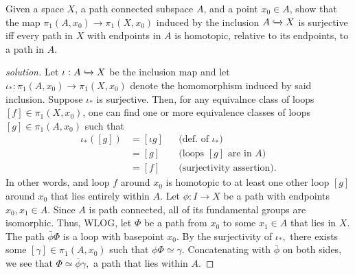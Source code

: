 \documentclass{article}
\newcommand{\1}{\mathbbm{1}}
\newenvironment{problem}[2][Problem]{\begin{trivlist}
\item[\hskip \labelsep {\bfseries #1}\hskip \labelsep {\bfseries #2.}]}{\end{trivlist}}
\begin{document}
\begin{problem}{6}
    Given a space $X$, a path connected subspace $A$, and a point $x_0 \in A$, show that the map $\pi_1(A, x_0) \longrightarrow \pi_1(X, x_0)$ induced by the inclusion $A \xhookrightarrow{} X$ is surjective iff every path in $X$ with endpoints in $A$ is homotopic, relative to its endpoints, to a path in $A.$
\end{problem}
\begin{proof}[solution]
    Let $\iota:A \xhookrightarrow{} X$ be the inclusion map and let $\iota_*:\pi_1(A, x_0) \longrightarrow \pi_1(X, x_0)$ denote the homomorphism induced by said inclusion. Suppose $\iota_*$ is surjective. Then, for any equivalnce class of loops $[f] \in \pi_1(X, x_0)$, one can find one or more equivalence classes of loops $[g] \in \pi_1(A, x_0)$ such that
    \begin{align*}
        \iota_*([g]) 
        &= [\iota g] && \text{(def. of $\iota_*$)} \\
        &= [g] && \text{(loops $[g]$ are in $A$)} \\
        &= [f] && \text{(surjectivity assertion)}.
    \end{align*} 
    In other words, and loop $f$ around $x_0$ is homotopic to at least one other loop $[g]$ around $x_0$ that lies entirely within $A.$ Let $\phi : I \longrightarrow X$ be a path with endpoints $x_0, x_1\in A.$ Since $A$ is path connected, all of its fundamental groups are isomorphic. Thus, WLOG, let $\Phi$ be a path from $x_0$ to some $x_1 \in A$ that lies in $X.$ The path $\bar{\phi}\Phi$ is a loop with basepoint $x_0.$ By the surjectivity of $\iota_*,$ there exists some $[\gamma] \in \pi_1(A, x_0)$ such that ${\phi}\Phi \simeq \gamma.$ Concatenating with $\bar{\phi}$ on both sides, we see that $\Phi \simeq \bar{\phi} \gamma,$ a path that lies within $A.$  
\end{proof}
\end{document}
